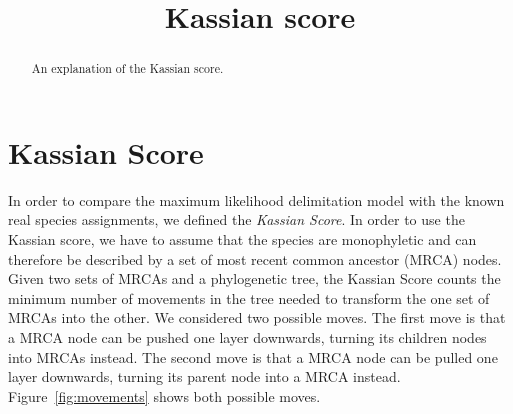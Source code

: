 \documentclass{llncs}
\begin{document}
\title{Kassian score}



\maketitle

\begin{abstract}
An explanation of the Kassian score.
\end{abstract}

\section{Kassian Score}
In order to compare the maximum likelihood delimitation model with the known real species assignments, we defined the \emph{Kassian Score}. In order to use the Kassian score, we have to assume that the species are monophyletic and can therefore be described by a set of most recent common ancestor (MRCA) nodes. Given two sets of MRCAs and a phylogenetic tree, the Kassian Score counts the minimum number of movements in the tree needed to transform the one set of MRCAs into the other. We considered two possible moves. The first move is that a MRCA node can be pushed one layer downwards, turning its children nodes into MRCAs instead. The second move is that a MRCA node can be pulled one layer downwards, turning its parent node into a MRCA instead. Figure~\ref{fig:movements} shows both possible moves.
\end{document}
